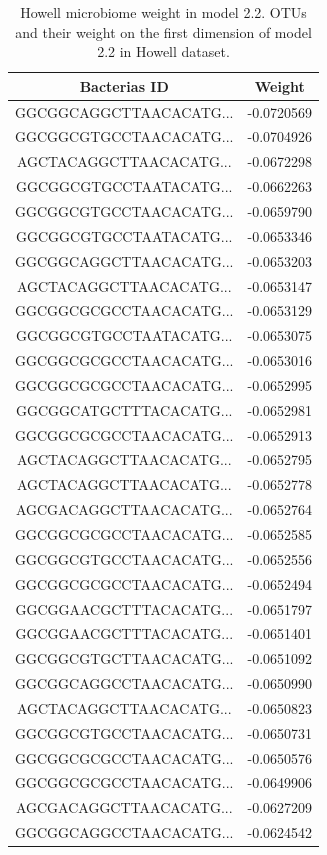 \documentclass[
  12pt,
  a4paper,
  twoside,
  openright]{book}
\begin{document}
\begin{longtable}[t]{cc}
\caption[Howell microbiome weight in model 2.2]{\label{tab:howell-microbiome-2-2}Howell microbiome weight in model 2.2. OTUs and their weight on the first dimension of model 2.2 in Howell dataset.}\\
\toprule
Bacterias ID & Weight\\
\midrule
GGCGGCAGGCTTAACACATG... & -0.0720569\\
GGCGGCGTGCCTAACACATG... & -0.0704926\\
AGCTACAGGCTTAACACATG... & -0.0672298\\
GGCGGCGTGCCTAATACATG... & -0.0662263\\
GGCGGCGTGCCTAACACATG... & -0.0659790\\
\addlinespace
GGCGGCGTGCCTAATACATG... & -0.0653346\\
GGCGGCAGGCTTAACACATG... & -0.0653203\\
AGCTACAGGCTTAACACATG... & -0.0653147\\
GGCGGCGCGCCTAACACATG... & -0.0653129\\
GGCGGCGTGCCTAATACATG... & -0.0653075\\
\addlinespace
GGCGGCGCGCCTAACACATG... & -0.0653016\\
GGCGGCGCGCCTAACACATG... & -0.0652995\\
GGCGGCATGCTTTACACATG... & -0.0652981\\
GGCGGCGCGCCTAACACATG... & -0.0652913\\
AGCTACAGGCTTAACACATG... & -0.0652795\\
\addlinespace
AGCTACAGGCTTAACACATG... & -0.0652778\\
AGCGACAGGCTTAACACATG... & -0.0652764\\
GGCGGCGCGCCTAACACATG... & -0.0652585\\
GGCGGCGTGCCTAACACATG... & -0.0652556\\
GGCGGCGCGCCTAACACATG... & -0.0652494\\
\addlinespace
GGCGGAACGCTTTACACATG... & -0.0651797\\
GGCGGAACGCTTTACACATG... & -0.0651401\\
GGCGGCGTGCTTAACACATG... & -0.0651092\\
GGCGGCAGGCCTAACACATG... & -0.0650990\\
AGCTACAGGCTTAACACATG... & -0.0650823\\
\addlinespace
GGCGGCGTGCCTAACACATG... & -0.0650731\\
GGCGGCGCGCCTAACACATG... & -0.0650576\\
GGCGGCGCGCCTAACACATG... & -0.0649906\\
AGCGACAGGCTTAACACATG... & -0.0627209\\
GGCGGCAGGCCTAACACATG... & -0.0624542\\
\bottomrule
\end{longtable}
\end{document}
